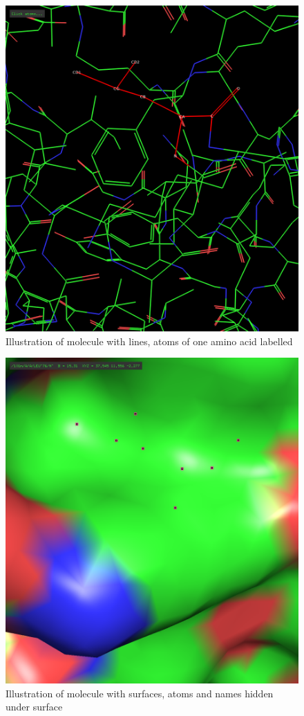 \documentclass[11pt]{article}
\begin{document}
\begin{itemize}
\begin{figure}[htbp]
\centering
\includegraphics[width=.9\linewidth]{./lines.png}
\caption{Illustration of molecule with lines, atoms of one amino acid labelled}
\end{figure}

\begin{figure}[htbp]
\centering
\includegraphics[width=.9\linewidth]{./surfaces.png}
\caption{Illustration of molecule with surfaces, atoms and names hidden under surface}
\end{figure}
\end{itemize}
\end{document}
